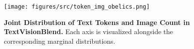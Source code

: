 \begin{figure}
    \centering
    \texttt{[image: figures/src/token\_img\_obelics.png]}
    \caption{
    \textbf{Joint Distribution of Text Tokens and Image Count in TextVisionBlend.} 
    Each axis is visualized alongside the corresponding marginal distributions.
    }
    \label{fig:joint_distribution}
\end{figure}